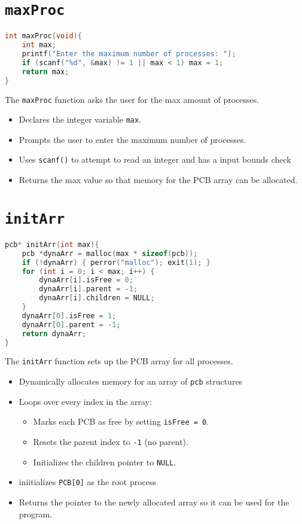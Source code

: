 \documentclass[12pt]{article}
\begin{document}
\section*{\texttt{maxProc}}
\begin{lstlisting}[language=C]
int maxProc(void){
    int max;
    printf("Enter the maximum number of processes: ");
    if (scanf("%d", &max) != 1 || max < 1) max = 1;
    return max;
}
\end{lstlisting}

The \texttt{maxProc} function asks the user for the max amount of processes.
\begin{itemize}
  \item Declares the integer variable \texttt{max}.
  \item Prompts the user to enter the maximum number of processes.
  \item Uses \texttt{scanf()} to attempt to read an integer and has a input bounds check
    
  \item Returns the max value so that memory for the PCB array 
  can be allocated.
\end{itemize}


\section*{\texttt{initArr}}
\begin{lstlisting}[language=C]
pcb* initArr(int max){
    pcb *dynaArr = malloc(max * sizeof(pcb));
    if (!dynaArr) { perror("malloc"); exit(1); }
    for (int i = 0; i < max; i++) {
        dynaArr[i].isFree = 0;
        dynaArr[i].parent = -1;
        dynaArr[i].children = NULL;
    }
    dynaArr[0].isFree = 1;
    dynaArr[0].parent = -1;
    return dynaArr;
}
\end{lstlisting}

The \texttt{initArr} function sets up the PCB array for all processes.
\begin{itemize}
  \item Dynamically allocates memory for an array of \texttt{pcb} structures
    \item Loops over every index in the array:
    \begin{itemize}
      \item Marks each PCB as free by setting \texttt{isFree = 0}.
      \item Resets the parent index to \texttt{-1} (no parent).
      \item Initializes the children pointer to \texttt{NULL}.
    \end{itemize}
  \item iniitializes \texttt{PCB[0]} as the root process

    
  \item Returns the pointer to the newly allocated array so it can be used for the program.
\end{itemize}
\end{document}
